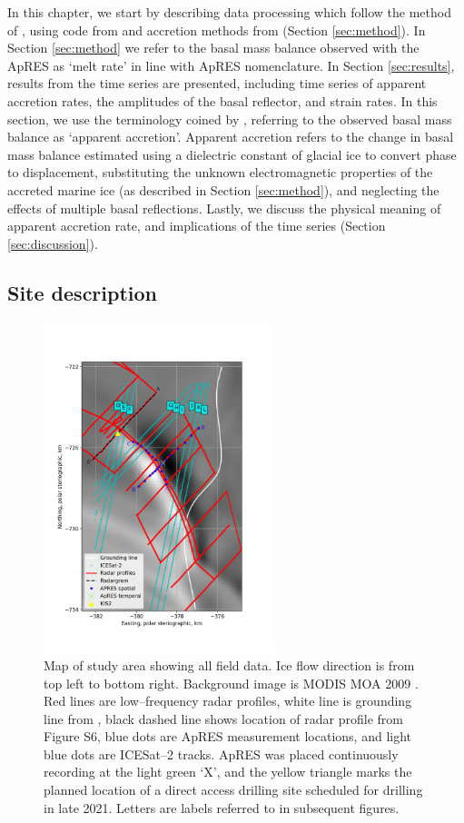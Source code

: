 In this chapter, we start by describing data processing  which follow the method of \cite{nicholls2015ground}, using code from \cite{stewart2018ice} and accretion methods from \cite{vavnkova2021nature} (Section \ref{sec:method}). In Section \ref{sec:method} we refer to the basal mass balance observed with the ApRES as `melt rate' in line with ApRES nomenclature. In Section \ref{sec:results}, results from the time series are presented, including time series of apparent accretion rates, the amplitudes of the basal reflector, and strain rates. In this section, we use the terminology coined by \cite{vavnkova2021nature}, referring to the observed basal mass balance as `apparent accretion'. Apparent accretion refers to the change in basal mass balance estimated using a dielectric constant of glacial ice to convert phase to displacement, substituting the unknown electromagnetic properties of the accreted marine ice (as described in Section \ref{sec:method}), and neglecting the effects of multiple basal reflections.
 Lastly, we discuss the physical meaning of apparent accretion rate, and implications of the time series (Section \ref{sec:discussion}).

\subsection{Site description}
\newpage
\begin{figure}[!ht]
\centering
\includegraphics[width=0.6\textwidth]{chapters/2/geophysics_overview.png}
\caption[]{Map of study area showing all field data. Ice flow direction is from top left to bottom right. Background image is MODIS MOA 2009 \citep{haran2014modis}. Red lines are low--frequency radar profiles, white line is grounding line from \cite{depoorter2013amii}, black dashed line shows location of radar profile from Figure S6, blue dots are ApRES measurement locations, and light blue dots are ICESat--2 tracks.  ApRES was placed continuously recording at the light green `X', and the yellow triangle marks the planned location of a direct access drilling site scheduled for drilling in late 2021. Letters are labels referred to in subsequent figures.}
\label{fig:geophysics_overview_apres}
\end{figure}


